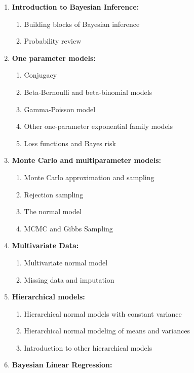\documentclass[11pt, a4paper]{article}
\begin{document}
\begin{enumerate}[label= {\color{darkblue}{\ArrowBoldRightStrobe}}]
	\item \textbf{Introduction to Bayesian Inference:}
	\begin{enumerate}[label= {\color{cyan}{\Rectangle}}]
		\item Building blocks of Bayesian inference
		\item Probability review
	\end{enumerate}
	\item \textbf{One parameter models: }
	\begin{enumerate}[label= {\color{cyan}{\Rectangle}}]
		\item Conjugacy
		\item Beta-Bernoulli and beta-binomial models
		\item Gamma-Poisson model
		\item Other one-parameter exponential family models
		\item Loss functions and Bayes risk
	\end{enumerate}
	\item \textbf{Monte Carlo and multiparameter models: }
	\begin{enumerate}[label= {\color{cyan}{\Rectangle}}]
		\item Monte Carlo approximation and sampling
		\item Rejection sampling
		\item The normal model
		\item MCMC and Gibbs Sampling
	\end{enumerate}
	\item \textbf{Multivariate Data: }
	\begin{enumerate}[label= {\color{cyan}{\Rectangle}}]
		\item Multivariate normal model
		\item Missing data and imputation
	\end{enumerate}
	\item \textbf{Hierarchical models: }
	\begin{enumerate}[label= {\color{cyan}{\Rectangle}}]
		\item Hierarchical normal models with constant variance
		\item Hierarchical normal modeling of means and variances
		\item Introduction to other hierarchical models
	\end{enumerate}
	\item \textbf{Bayesian Linear Regression: }

\end{enumerate}
\end{document}
